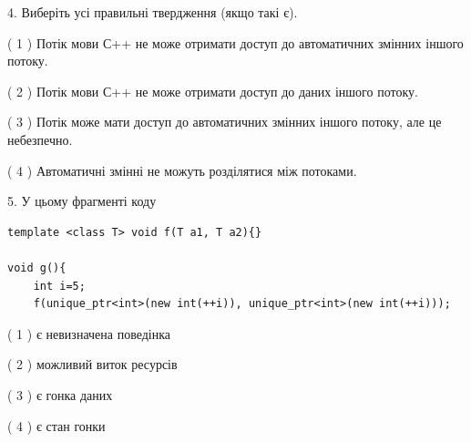 \documentclass[12pt, ukrainian]{article}
\begin{document}
\begin {large}
{%
4. Виберіть усі правильні твердження (якщо такі є).\par
\vspace{2mm}

( 1 ) Потік мови С++ не може отримати доступ до автоматичних змінних іншого потоку.%

( 2 ) Потік мови С++ не може отримати доступ до даних іншого потоку.%

( 3 ) Потік може мати доступ до автоматичних змінних іншого потоку, але це небезпечно.%

( 4 ) Автоматичні змінні не можуть розділятися між потоками.%


5. У цьому фрагменті коду
\begin{verbatim}
template <class T> void f(T a1, T a2){}

void g(){
    int i=5;
    f(unique_ptr<int>(new int(++i)), unique_ptr<int>(new int(++i)));
\end{verbatim}

( 1 ) є невизначена поведінка%

( 2 ) можливий виток ресурсів%

( 3 ) є гонка даних%

( 4 ) є стан гонки%
}
\end {large}
\end{document}
